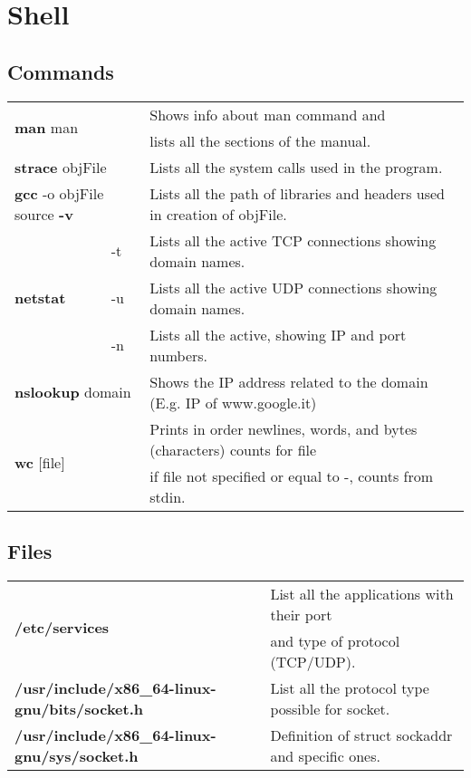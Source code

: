 \chapter{Shell}

\section{Commands}

\begin{table}[h]
\centering
\footnotesize
\begin{tabular}{|l|l|l|}
\hline
\multicolumn{2}{|l|}{\multirow{2}{*}{\textbf{man} man}}&{Shows info about man command and}\\
\multicolumn{2}{|l|}{} & {lists all the sections of the manual.}\\
\hline
\multicolumn{2}{|l|}{\textbf{strace} objFile} & {Lists all the system calls used in the program.}\\
\hline
\multicolumn{2}{|l|}{\textbf{gcc} -o objFile source \textbf{-v}} & {Lists all the path of libraries and headers used in creation of objFile.}\\
\hline
\multirow{3}{*}{\textbf{netstat}} & {-t} & {Lists all the active TCP connections showing domain names.}\\
\cline{2-3}
& {-u} & {Lists all the active UDP connections showing domain names.}\\
\cline{2-3}
& {-n} & {Lists all the active, showing IP and port numbers.}\\
\hline
\multicolumn{2}{|l|}{\textbf{nslookup} domain} & {Shows the IP address related to the domain (E.g. IP of www.google.it)}\\
\hline
\multicolumn{2}{|l|}{\multirow{2}{*}{\textbf{wc} [file]}} & {Prints in order newlines, words, and bytes (characters) counts for file}\\
\multicolumn{2}{|l|}{} & {if file not specified or equal to -, counts from stdin.}\\
\hline
\end{tabular}
\end{table}


\section{Files}\label{files}
\begin{table}[h]
\centering
\footnotesize
\begin{tabular}{|l|l|}
\hline
\multirow{2}{*}{\textbf{/etc/services}} & {List all the applications with their port}\\
& {and type of protocol (TCP/UDP).}\\
\hline
{\textbf{/usr/include/x86\_64-linux-gnu/bits/socket.h}} & {List all the protocol type possible for socket.}\\
\hline
{\textbf{/usr/include/x86\_64-linux-gnu/sys/socket.h}} & {Definition of struct sockaddr and specific ones.}\\
\hline
\end{tabular}
\end{table}

